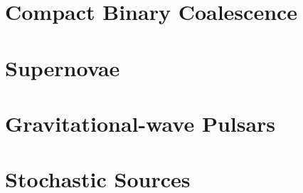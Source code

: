 \documentclass[openleft]{kentigern}
\theoremstyle{definition}
\begin{document}





 \section{Compact Binary Coalescence}
 \label{sec:cbc}
 

 \section{Supernovae}
 \label{sec:sn}
 

 \section{Gravitational-wave Pulsars}
 \label{sec:pulsar}
 

 \section{Stochastic Sources}
 \label{sec:stochastic-sources}
 

% 

\end{document}

